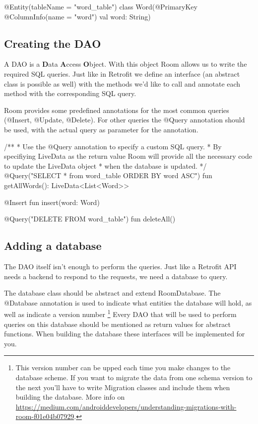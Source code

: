\begin{android}
@Entity(tableName = "word_table")
class Word(@PrimaryKey @ColumnInfo(name = "word") val word: String)
\end{android}

\subsection{Creating the DAO}
A DAO is a \textbf{D}ata \textbf{A}ccess \textbf{O}bject.
With this object Room allows us to write the required SQL queries. 
Just like in Retrofit we define an interface (an abstract class is possible as well) with the methods we'd like to call and annotate each method with the corresponding SQL query.

Room provides some predefined annotations for the most common queries (@Insert, @Update, @Delete).
For other queries the @Query annotation should be used, with the actual query as parameter for the annotation.

\begin{android}
/**
* Use the @Query annotation to specify a custom SQL query.
* By specifiying LiveData as the return value Room will provide all the necessary code to update the LiveData object
* when the database is updated.
*/
@Query("SELECT * from word_table ORDER BY word ASC")
fun getAllWords(): LiveData<List<Word>>


@Insert
fun insert(word: Word)

@Query("DELETE FROM word_table")
fun deleteAll()
\end{android}

\subsection{Adding a database}
The DAO itself isn't enough to perform the queries.
Just like a Retrofit API needs a backend to respond to the requests, we need a database to query. 

The database class should be abstract and extend RoomDatabase.
The @Database annotation is used to indicate what entities the database will hold, as well as indicate a version number
\footnote{This version number can be upped each time you make changes to the database scheme. 
	If you want to migrate the data from one schema version to the next you'll have to write Migration classes and include them when building the database.
	More info on \url{https://medium.com/androiddevelopers/understanding-migrations-with-room-f01e04b07929}.}
Every DAO that will be used to perform queries on this database should be mentioned as return values for abstract functions.
When building the database these interfaces will be implemented for you.

